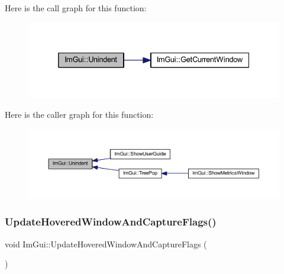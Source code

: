 Here is the call graph for this function\+:
\nopagebreak
\begin{figure}[H]
\begin{center}
\leavevmode
\includegraphics[width=332pt]{namespace_im_gui_ad577d36753634c9bbdc3750b0e5217f5_cgraph}
\end{center}
\end{figure}
Here is the caller graph for this function\+:
\nopagebreak
\begin{figure}[H]
\begin{center}
\leavevmode
\includegraphics[width=350pt]{namespace_im_gui_ad577d36753634c9bbdc3750b0e5217f5_icgraph}
\end{center}
\end{figure}
\mbox{\label{namespace_im_gui_a8156f9d63c3184d40e7e303be175b5fb}} 
\subsubsection{\texorpdfstring{Update\+Hovered\+Window\+And\+Capture\+Flags()}{UpdateHoveredWindowAndCaptureFlags()}}
{\footnotesize\ttfamily void Im\+Gui\+::\+Update\+Hovered\+Window\+And\+Capture\+Flags (\begin{DoxyParamCaption}{ }\end{DoxyParamCaption})}

\mbox{\label{namespace_im_gui_a67808962a8f76d51e7dfc701729f1591}} 
